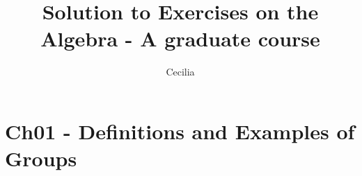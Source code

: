 \documentclass{article}
\title{Solution to Exercises on the \\Algebra - A graduate course}
\author{Cecilia}
\begin{document}
\maketitle

\section*{Ch01 - Definitions and Examples of Groups}
\end{document}
